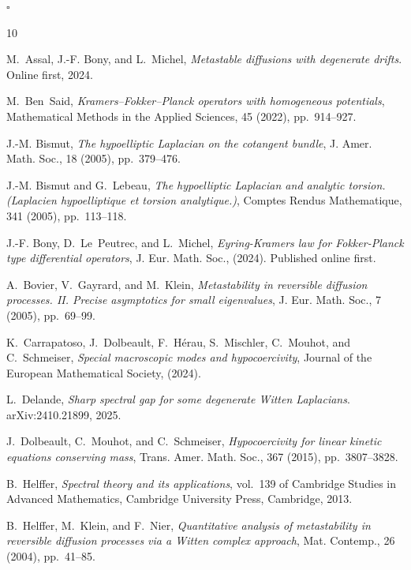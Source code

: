 \documentclass[12pt]{amsart}
\newcommand{\ep}{\hfill $\square$}
\numberwithin{equation}{section}
\numberwithin{figure}{section}
\begin{document}
\ep

\vfill
\begin{thebibliography}{10}

{\sc M.~Assal, J.-F. Bony, and L.~Michel}, {\em Metastable diffusions with degenerate drifts}.
\newblock Online first, 2024.

{\sc M.~Ben~Said}, {\em {K}ramers–{F}okker–{P}lanck operators with homogeneous potentials}, Mathematical Methods in the Applied Sciences, 45 (2022), pp.~914--927.

{\sc J.-M. Bismut}, {\em The hypoelliptic {L}aplacian on the cotangent bundle}, J. Amer. Math. Soc., 18 (2005), pp.~379--476.

{\sc J.-M. Bismut and G.~Lebeau}, {\em The hypoelliptic {L}aplacian and analytic torsion. ({L}aplacien hypoelliptique et torsion analytique.)}, Comptes Rendus Mathematique, 341 (2005), pp.~113--118.

{\sc J.-F. Bony, D.~Le~Peutrec, and L.~Michel}, {\em {Eyring-Kramers law for Fokker-Planck type differential operators}}, J. Eur. Math. Soc.,  (2024).
\newblock Published online first.

{\sc A.~Bovier, V.~Gayrard, and M.~Klein}, {\em Metastability in reversible diffusion processes. {II}. {P}recise asymptotics for small eigenvalues}, J. Eur. Math. Soc., 7 (2005), pp.~69--99.

{\sc K.~Carrapatoso, J.~Dolbeault, F.~H\'erau, S.~Mischler, C.~Mouhot, and C.~Schmeiser}, {\em Special macroscopic modes and hypocoercivity}, Journal of the European Mathematical Society,  (2024).

{\sc L.~Delande}, {\em Sharp spectral gap for some degenerate {W}itten {L}aplacians}.
\newblock arXiv:2410.21899, 2025.

{\sc J.~Dolbeault, C.~Mouhot, and C.~Schmeiser}, {\em Hypocoercivity for linear kinetic equations conserving mass}, Trans. Amer. Math. Soc., 367 (2015), pp.~3807--3828.

{\sc B.~Helffer}, {\em Spectral theory and its applications}, vol.~139 of Cambridge Studies in Advanced Mathematics, Cambridge University Press, Cambridge, 2013.

{\sc B.~Helffer, M.~Klein, and F.~Nier}, {\em Quantitative analysis of metastability in reversible diffusion processes via a {W}itten complex approach}, Mat. Contemp., 26 (2004), pp.~41--85.


\end{thebibliography}
\end{document}
